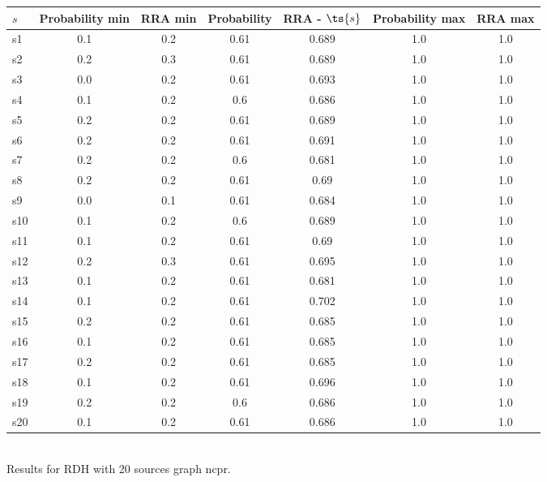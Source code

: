 \documentclass{article}
\begin{document}
\noindent\begin{tabular}{|l|c|c|c|c|c|c|}
\hline
$s$& Probability min & RRA min & Probability & RRA - $\ts{s}$ & Probability max & RRA max\\
\hline
s1 &0.1 & 0.2 & 0.61 & 0.689 & 1.0 & 1.0\\
\hline
s2 &0.2 & 0.3 & 0.61 & 0.689 & 1.0 & 1.0\\
\hline
s3 &0.0 & 0.2 & 0.61 & 0.693 & 1.0 & 1.0\\
\hline
s4 &0.1 & 0.2 & 0.6 & 0.686 & 1.0 & 1.0\\
\hline
s5 &0.2 & 0.2 & 0.61 & 0.689 & 1.0 & 1.0\\
\hline
s6 &0.2 & 0.2 & 0.61 & 0.691 & 1.0 & 1.0\\
\hline
s7 &0.2 & 0.2 & 0.6 & 0.681 & 1.0 & 1.0\\
\hline
s8 &0.2 & 0.2 & 0.61 & 0.69 & 1.0 & 1.0\\
\hline
s9 &0.0 & 0.1 & 0.61 & 0.684 & 1.0 & 1.0\\
\hline
s10 &0.1 & 0.2 & 0.6 & 0.689 & 1.0 & 1.0\\
\hline
s11 &0.1 & 0.2 & 0.61 & 0.69 & 1.0 & 1.0\\
\hline
s12 &0.2 & 0.3 & 0.61 & 0.695 & 1.0 & 1.0\\
\hline
s13 &0.1 & 0.2 & 0.61 & 0.681 & 1.0 & 1.0\\
\hline
s14 &0.1 & 0.2 & 0.61 & 0.702 & 1.0 & 1.0\\
\hline
s15 &0.2 & 0.2 & 0.61 & 0.685 & 1.0 & 1.0\\
\hline
s16 &0.1 & 0.2 & 0.61 & 0.685 & 1.0 & 1.0\\
\hline
s17 &0.2 & 0.2 & 0.61 & 0.685 & 1.0 & 1.0\\
\hline
s18 &0.1 & 0.2 & 0.61 & 0.696 & 1.0 & 1.0\\
\hline
s19 &0.2 & 0.2 & 0.6 & 0.686 & 1.0 & 1.0\\
\hline
s20 &0.1 & 0.2 & 0.61 & 0.686 & 1.0 & 1.0\\
\hline
\end{tabular}\\

\noindent Results for RDH with 20 sources graph ncpr.
\end{document}
